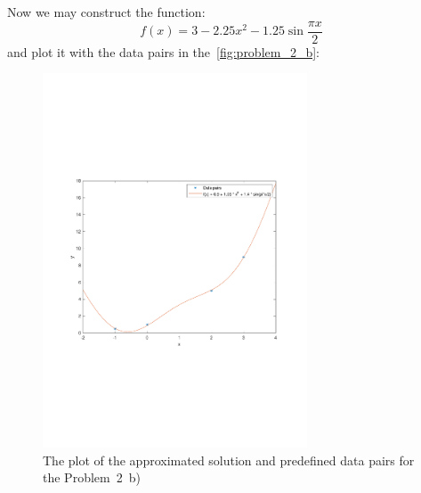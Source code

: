 Now we may construct the function:
\begin{equation*}
  f(x)=3-2.25x^2-1.25\sin{\frac{\pi{}x}{2}}
\end{equation*}
and plot it with the data pairs in the~\autoref{fig:problem_2_b}:

\begin{figure}[h]
  \centering
  \includegraphics[width=0.7\textwidth]{images/Problem_2_b_plot.pdf}
  \caption{The plot of the approximated solution and predefined data pairs
    for the Problem~2~b)}\label{fig:problem_2_b}
\end{figure}
